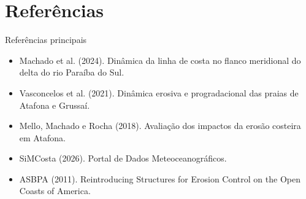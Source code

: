 \documentclass[aspectratio=169,11pt]{beamer}
\newif\ifcombibliografia
\begin{document}
\section{Referências}
\ifcombibliografia
\nocite{briso_atafona_2021}
\nocite{machado2024_dinamica_linha_costa_paraiba_sul}
\nocite{mello2018_erosao_atafona}
\nocite{simcosta_dados_2026}
\nocite{vasconcelos2021_atafona_grussai}
\nocite{asbpa2011_erosion_control_structures}
\nocite{coreloc_imagem}

\begin{frame}[allowframebreaks]{Referências}
  \scriptsize
  \setlength{\bibitemsep}{0pt}
  \setlength{\bibhang}{0pt}
  \renewcommand*{\bibfont}{\scriptsize}
  \printbibliography[heading=none]
\end{frame}
\else
\begin{frame}{Referências principais}
\small
\begin{itemize}
  \item Machado et al. (2024). Dinâmica da linha de costa no flanco meridional do delta do rio Paraíba do Sul.
  \item Vasconcelos et al. (2021). Dinâmica erosiva e progradacional das praias de Atafona e Grussaí.
  \item Mello, Machado e Rocha (2018). Avaliação dos impactos da erosão costeira em Atafona.
  \item SiMCosta (2026). Portal de Dados Meteoceanográficos.
  \item ASBPA (2011). Reintroducing Structures for Erosion Control on the Open Coasts of America.
\end{itemize}
\end{frame}
\fi
\end{document}
